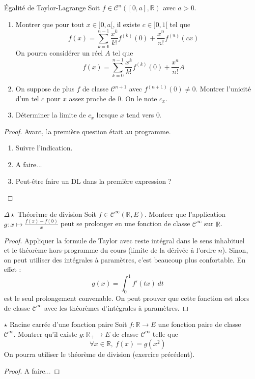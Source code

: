 \documentclass[french,a4paper]{article}
\newcommand{\R}{\mathbb{R}}
\theoremstyle{plain}
\theoremstyle{definition}
\theoremstyle{remark}
\begin{document}
\begin{ex}[Moulin.FV.28]{Égalité de Taylor-Lagrange}
	Soit $f\in\mathcal{C}^n([0,a],\R)$ avec $a>0$.
	\begin{enumerate}
		\item Montrer que pour tout $x\in]0,a[$, il existe $c\in]0,1[$ tel que $$f(x)=\sum_{k=0}^{n-1}\frac{x^k}{k!}f^{(k)}(0)+\frac{x^n}{n!}f^{(n)}(cx)$$ On pourra considérer un réel $A$ tel que $$f(x)=\sum_{k=0}^{n-1}\frac{x^k}{k!}f^{(k)}(0)+\frac{x^n}{n!}A$$
		\item On suppose de plus $f$ de classe $\mathcal{C}^{n+1}$ avec $f^{(n+1)}(0)\ne 0$. Montrer l'unicité d'un tel $c$ pour $x$ assez proche de $0$. On le note $c_x$.
		\item Déterminer la limite de $c_x$ lorsque $x$ tend vers $0$.
	\end{enumerate}
\end{ex}
\begin{proof}
	Avant, la première question était au programme.
	\begin{enumerate}
		\item Suivre l'indication.
		\item A faire...
		\item Peut-être faire un DL dans la première expression ?
	\end{enumerate}
\end{proof}

\begin{ex}[Moulin.FV.29]{$\Delta\star$ Théorème de division}
	Soit $f\in\mathcal{C}^\infty(\R,E)$. Montrer que l'application $g:x\mapsto\displaystyle\frac{f(x)-f(0)}{x}$ peut se prolonger en une fonction de classe $\mathcal{C}^\infty$ sur $\R$.
\end{ex}
\begin{proof}
	Appliquer la formule de Taylor avec reste intégral dans le sens inhabituel et le théorème hors-programme du cours (limite de la dérivée à l'ordre $n$). Sinon, on peut utiliser des intégrales à paramètres, c'est beaucoup plus confortable. En effet : $$g(x)=\int_{0}^{1}f'(tx)\ dt$$ est le seul prolongement convenable. On peut prouver que cette fonction est alors de classe $\mathcal{C}^\infty$ avec les théorèmes d'intégrales à paramètres.
\end{proof}

\begin{ex}[Moulin.FV.30]{$\star$ Racine carrée d'une fonction paire}
	Soit $f:\R\to E$ une fonction paire de classe $\mathcal{C}^\infty$. Montrer qu'il existe $g:\R_+\to E$ de classe $\mathcal{C}^\infty$ telle que $$\forall x\in\R,\ f(x)=g(x^2)$$ On pourra utiliser le théorème de division (exercice précédent).
\end{ex}
\begin{proof}
	A faire...
\end{proof}
\end{document}
